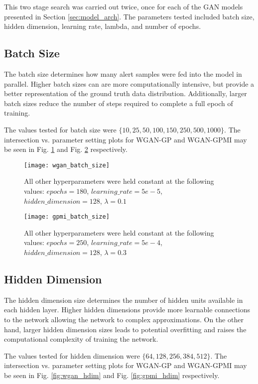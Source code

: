This two stage search was carried out twice, once for each of the GAN models presented in Section \ref{sec:model_arch}. The parameters tested included batch size, hidden dimension, learning rate, lambda, and number of epochs.

\subsection{Batch Size}
The batch size determines how many alert samples were fed into the model in parallel. Higher batch sizes can are more computationally intensive, but provide a better representation of the ground truth data distribution. Additionally, larger batch sizes reduce the number of steps required to complete a full epoch of training. 

The values tested for batch size were $\{10, 25, 50, 100, 150, 250, 500, 1000\}$. The intersection vs. parameter setting plots for WGAN-GP and WGAN-GPMI may be seen in Fig. \ref{fig:wgan_batch_size} and Fig. \ref{fig:gpmi_batch_size} respectively.

\begin{figure}[!htbp]
	\centering%
	\texttt{[image: wgan\_batch\_size]}
	\caption{
		All other hyperparameters were held constant at the following values: $epochs=180$, $learning\_rate=5e-5$, $hidden\_dimension=128$, $\lambda=0.1$
	}
	\label{fig:wgan_batch_size}
\end{figure}

\begin{figure}[!htbp]
	\centering%
	\texttt{[image: gpmi\_batch\_size]}
	\caption{
		All other hyperparameters were held constant at the following values: $epochs=250$, $learning\_rate=5e-4$, $hidden\_dimension=128$, $\lambda=0.3$
	}
	\label{fig:gpmi_batch_size}
\end{figure}



\subsection{Hidden Dimension}
The hidden dimension size determines the number of hidden units available in each hidden layer. Higher hidden dimensions provide more learnable connections to the network allowing the network to complex approximations. On the other hand, larger hidden dimension sizes leads to potential overfitting and raises the computational complexity of training the network. 

The values tested for hidden dimension were $\{64, 128, 256, 384, 512\}$. The intersection vs. parameter setting plots for WGAN-GP and WGAN-GPMI may be seen in Fig. \ref{fig:wgan_hdim} and Fig. \ref{fig:gpmi_hdim} respectively. 


